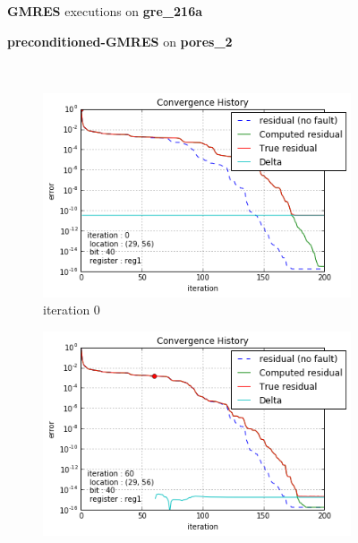 \begin{figure}[h]
	\centering
    
\begin{minipage}[b]{0.45\linewidth}
\centering
\textbf{GMRES} executions on \textbf{gre_216a} 
\end{minipage}
\quad
\begin{minipage}{0.45\linewidth}
\centering
\textbf{preconditioned-GMRES} on \textbf{pores_2}
\end{minipage}\\


    \begin{minipage}[b]{0.48\linewidth}
	\begin{subfigure}[t]{\linewidth}
		\centering
		\includegraphics[width=\linewidth]{figures/gre_216a/convergence_history_iteration_0.png}
		\caption{iteration 0}\label{fig:gre_216a_conv_hist_iteration_0}		
	\end{subfigure}
	\quad
	\begin{subfigure}[t]{\linewidth}
		\centering
		\includegraphics[width=\linewidth]{figures/gre_216a/convergence_history_iteration_1.png}

\end{subfigure}
\end{minipage}
\end{figure}
